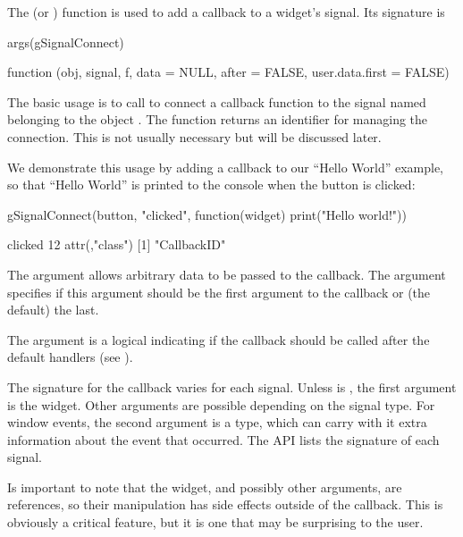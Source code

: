 The  (or ) function is used
to add a callback to a widget's signal. Its signature is
\begin{Schunk}
\begin{Sinput}
 args(gSignalConnect)
\end{Sinput}
\begin{Soutput}
function (obj, signal, f, data = NULL, after = FALSE, user.data.first = FALSE)  
\end{Soutput}
\end{Schunk}
%
The basic usage is to call  to connect a
callback function  to the signal named
 belonging to the object
. The function returns an identifier for
managing the connection. This is not usually necessary but will be
discussed later.

We demonstrate this usage by adding a callback to our ``Hello World''
example, so that ``Hello World'' is printed to the console when the
button is clicked:
\begin{Schunk}
\begin{Sinput}
 gSignalConnect(button, "clicked", 
                function(widget) print("Hello world!"))
\end{Sinput}
\begin{Soutput}
clicked 
     12 
attr(,"class")
[1] "CallbackID"
\end{Soutput}
\end{Schunk}
%

The  argument allows arbitrary data to
be passed to the callback.  The
 argument specifies if this
 argument should be the first argument
to the callback or (the default) the last.

The  argument is a logical indicating
if the callback should be called after the default handlers (see
).

The signature for the callback varies for each signal. Unless
 is , the first argument is the
widget. Other arguments are possible depending on the signal type. For
window events, the second argument is a  type, which
can carry with it extra information about the event that occurred. The
\GTK\/ API lists the signature of each signal.

Is important to note that the widget, and possibly other arguments,
are references, so their manipulation has side effects outside of the
callback. This is obviously a critical feature, but it is one that
may be surprising to the \R\/ user.

